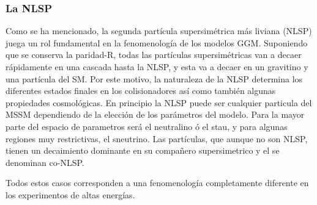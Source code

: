 \subsubsection{La NLSP}

Como se ha mencionado, la segunda partícula supersimétrica más liviana (NLSP) juega un rol fundamental
en la fenomenología de los modelos GGM. Suponiendo que se conserva la paridad-R,
todas las partículas supersimétricas van a decaer rápidamente en una cascada
hasta la NLSP, y esta va a decaer en un gravitino y una partícula del SM. Por este motivo, la
naturaleza de la NLSP determina los diferentes estados finales en los
colisionadores así como también algunas propiedades cosmológicas. En principio
la NLSP puede ser cualquier particula del MSSM dependiendo de la elección de los
parámetros del modelo. Para la mayor parte del espacio de parametros será el neutralino ó
el stau, y para algunas regiones muy restrictivas, el
sneutrino\cite{arxiv:9801271}.
Las partículas, que aunque no son NLSP, tienen un decaimiento dominante en su
compañero supersimetrico y el {\gravino} se denominan co-NLSP.






Todos estos casos corresponden a una fenomenología completamente diferente en
los experimentos de altas energías.


